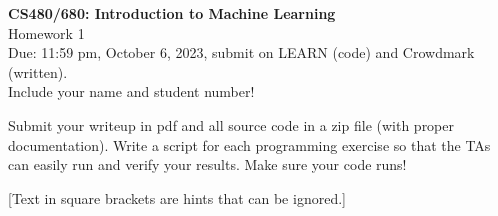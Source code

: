 \documentclass[10pt,letter,notitlepage]{article}
\newcounter{exercise}
\begin{document}
\begin{center}
  \large{\textbf{CS480/680: Introduction to Machine Learning} \\ Homework 1\\ Due: 11:59 pm, October 6, 2023, submit on LEARN (code) and Crowdmark (written).} \\

Include your name and student number!

\end{center}

\begin{center}
Submit your writeup in pdf and all source code in a zip file (with proper documentation). Write a script for each programming exercise so that the TAs can easily run and verify your results. Make sure your code runs!

[Text in square brackets are hints that can be ignored.]
\end{center}
\end{document}
